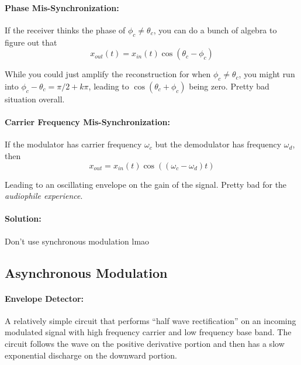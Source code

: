 \documentclass[a4paper,12pt]{report}
\begin{document}
\paragraph{Phase Mis-Synchronization: } If the receiver thinks the phase of $\phi_c \neq \theta_c$, you can do a bunch of algebra to figure out that
\begin{equation}
x_{out}(t) = x_{in}(t) \cos(\theta_c - \phi_c)
\end{equation}

While you could just amplify the reconstruction for when $\phi_c \neq \theta_c$, you might run into $\phi_c - \theta_c = \pi/2 + k\pi$, leading to $\cos(\theta_c + \phi_c)$ being zero. Pretty bad situation overall.

\paragraph{Carrier Frequency Mis-Synchronization: } If the modulator has carrier frequency $\omega_c$ but the demodulator has frequency $\omega_d$, then 
\begin{equation}
x_{out} = x_{in}(t) \cos((\omega_c-\omega_d) t)
\end{equation}

Leading to an oscillating envelope on the gain of the signal. Pretty bad for the \textit{audiophile experience}.

\paragraph{Solution: } Don't use synchronous modulation lmao




\subsection{Asynchronous Modulation}

\paragraph{Envelope Detector: } A relatively simple circuit that performs ``half wave rectification'' on an incoming modulated signal with high frequency carrier and low frequency base band. The circuit follows the wave on the positive derivative portion and then has a slow exponential discharge on the downward portion.
\end{document}
